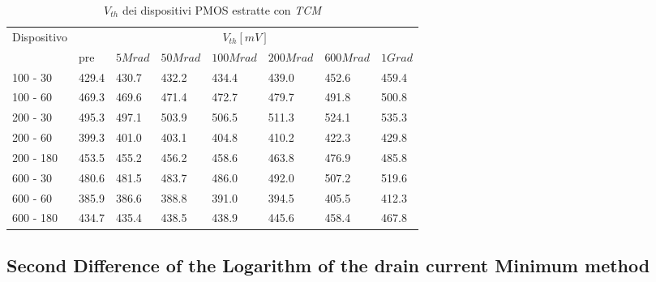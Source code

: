 \documentclass[12pt, letterpaper]{book}
\begin{document}
\begin{table}[H]
  \renewcommand{\arraystretch}{1.3}
    \begin{tabular}{m{2cm} m{0.8cm} m{1.1cm} m{1.3cm} m{1.5cm} m{1.5cm} m{1.5cm} m{1cm}}
      \toprule
      \multirow{2}{*}{Dispositivo} & \multicolumn{7}{c}{$V_{th} [mV] $}                                                                    \\
      \cmidrule{2-8}
                                   & pre                               & $5Mrad$ & $50Mrad$ & $100Mrad$ & $200Mrad$ & $600Mrad$ & $1Grad$ \\
      \midrule
      100 - 30                     & 429.4                             & 430.7   & 432.2    & 434.4     & 439.0     & 452.6     & 459.4   \\
      \hline
      100 - 60                     & 469.3                             & 469.6   & 471.4    & 472.7     & 479.7     & 491.8     & 500.8   \\
      \hline
      200 - 30                     & 495.3                             & 497.1   & 503.9    & 506.5     & 511.3     & 524.1     & 535.3   \\
      \hline
      200 - 60                     & 399.3                             & 401.0   & 403.1    & 404.8     & 410.2     & 422.3     & 429.8   \\
      \hline
      200 - 180                    & 453.5                             & 455.2   & 456.2    & 458.6     & 463.8     & 476.9     & 485.8   \\
      \hline
      600 - 30                     & 480.6                             & 481.5   & 483.7    & 486.0     & 492.0     & 507.2     & 519.6   \\
      \hline
      600 - 60                     & 385.9                             & 386.6   & 388.8    & 391.0     & 394.5     & 405.5     & 412.3   \\
      \hline
      600 - 180                    & 434.7                             & 435.4   & 438.5    & 438.9     & 445.6     & 458.4     & 467.8   \\
      \bottomrule
    \end{tabular}
  \caption{$V_{th}$ dei dispositivi PMOS estratte con \emph{TCM}}
  \label{tab:VthTCM}
\end{table}





\subsection{Second Difference of the Logarithm of the drain current Minimum method}
\end{document}
